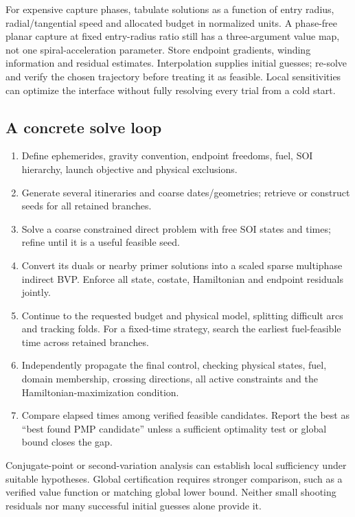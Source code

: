 \documentclass[journal, a4paper]{IEEEtran}
\begin{document}
For expensive capture phases, tabulate solutions as a function of entry radius, radial/tangential speed and allocated budget in normalized units. A phase-free planar capture at fixed entry-radius ratio still has a three-argument value map, not one spiral-acceleration parameter. Store endpoint gradients, winding information and residual estimates. Interpolation supplies initial guesses; re-solve and verify the chosen trajectory before treating it as feasible. Local sensitivities can optimize the interface without fully resolving every trial from a cold start.

\subsection{A concrete solve loop}
\begin{enumerate}
\item Define ephemerides, gravity convention, endpoint freedoms, fuel, SOI hierarchy, launch objective and physical exclusions.
\item Generate several itineraries and coarse dates/geometries; retrieve or construct seeds for all retained branches.
\item Solve a coarse constrained direct problem with free SOI states and times; refine until it is a useful feasible seed.
\item Convert its duals or nearby primer solutions into a scaled sparse multiphase indirect BVP. Enforce all state, costate, Hamiltonian and endpoint residuals jointly.
\item Continue to the requested budget and physical model, splitting difficult arcs and tracking folds. For a fixed-time strategy, search the earliest fuel-feasible time across retained branches.
\item Independently propagate the final control, checking physical states, fuel, domain membership, crossing directions, all active constraints and the Hamiltonian-maximization condition.
\item Compare elapsed times among verified feasible candidates. Report the best as ``best found PMP candidate'' unless a sufficient optimality test or global bound closes the gap.
\end{enumerate}
Conjugate-point or second-variation analysis can establish local sufficiency under suitable hypotheses. Global certification requires stronger comparison, such as a verified value function or matching global lower bound. Neither small shooting residuals nor many successful initial guesses alone provide it.
\end{document}
